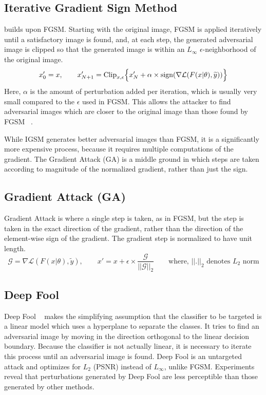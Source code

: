 \subsection{Iterative Gradient Sign Method}
\cite{Kurakin2016AdversarialEI} builds upon FGSM.
Starting with the original image, FGSM is applied iteratively until a satisfactory image is found, and, at each step, the generated adversarial image is clipped so that the generated image is within an $L_\infty$ $\epsilon$-neighborhood of the original image.
\[
x_0' = x, \qquad x_{N+1}' = \text{Clip}_{x,\epsilon} \Bigl\{x_N' + \alpha \times \text{sign}(\nabla \mathcal{L} (F(x|\theta),\widetilde{y}))  \Bigr\} 
\]
Here, $\alpha$ is the amount of perturbation added per iteration, which is usually very small compared to the $\epsilon$ used in FGSM.
This allows the attacker to find adversarial images which are closer to the original image than those found by FGSM ~\cite{Kurakin2016AdversarialEI}.


While IGSM generates better adversarial images than FGSM, it is a significantly more expensive process, because it requires multiple computations of the gradient. The Gradient Attack (GA) is a middle ground in which steps are taken according to magnitude of the normalized gradient, rather than just the sign.
\subsection{Gradient Attack (GA)} 
Gradient Attack is where a single step is taken, as in FGSM, but the step is taken in the exact direction of the gradient, rather than the direction of the element-wise sign of the gradient. The gradient step is normalized to have unit length.
\[
\mathcal{G} = \nabla \mathcal{L} (F(x|\theta),\widetilde{y}), \qquad x' = x + \epsilon \times \frac{\mathcal{G}}{\mathcal{||G||}_2} \qquad \text{where, $||.||_2$ denotes $L_2$ norm}
\]
\subsection{Deep Fool}
Deep Fool ~\cite{MoosaviDezfooli2016DeepFoolAS} makes the simplifying assumption that the classifier to be targeted is a linear model which uses a hyperplane to separate the classes.
It tries to find an adversarial image by moving in the direction orthogonal to the linear decision boundary. 
Because the classifier is not actually linear, it is necessary to iterate this process until an adversarial image is found.
Deep Fool is an untargeted attack and optimizes for $L_2$ (PSNR) instead of $L_\infty$, unlike FGSM. 
Experiments reveal that perturbations generated by Deep Fool are less perceptible than those generated by other methods.

